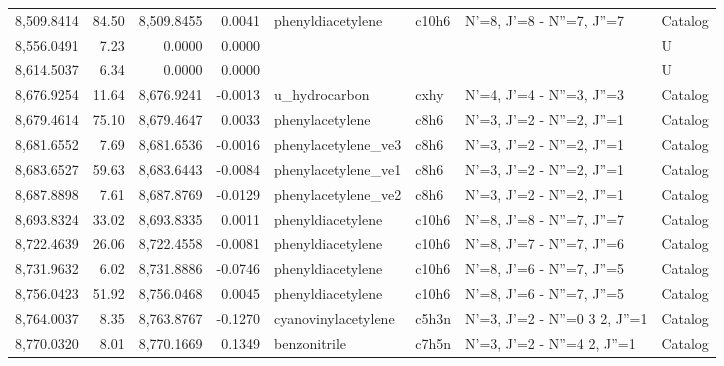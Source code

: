 \begin{longtable}{rrrrllll}
 8,509.8414 &     84.50 &        8,509.8455 &    0.0041 &           phenyldiacetylene &   c10h6 &            N'=8, J'=8 - N''=7, J''=7 &    Catalog \\
 8,556.0491 &      7.23 &            0.0000 &    0.0000 &                             &         &                                      &          U \\
 8,614.5037 &      6.34 &            0.0000 &    0.0000 &                             &         &                                      &          U \\
 8,676.9254 &     11.64 &        8,676.9241 &   -0.0013 &               u_hydrocarbon &    cxhy &            N'=4, J'=4 - N''=3, J''=3 &    Catalog \\
 8,679.4614 &     75.10 &        8,679.4647 &    0.0033 &             phenylacetylene &    c8h6 &            N'=3, J'=2 - N''=2, J''=1 &    Catalog \\
 8,681.6552 &      7.69 &        8,681.6536 &   -0.0016 &         phenylacetylene_ve3 &    c8h6 &            N'=3, J'=2 - N''=2, J''=1 &    Catalog \\
 8,683.6527 &     59.63 &        8,683.6443 &   -0.0084 &         phenylacetylene_ve1 &    c8h6 &            N'=3, J'=2 - N''=2, J''=1 &    Catalog \\
 8,687.8898 &      7.61 &        8,687.8769 &   -0.0129 &         phenylacetylene_ve2 &    c8h6 &            N'=3, J'=2 - N''=2, J''=1 &    Catalog \\
 8,693.8324 &     33.02 &        8,693.8335 &    0.0011 &           phenyldiacetylene &   c10h6 &            N'=8, J'=8 - N''=7, J''=7 &    Catalog \\
 8,722.4639 &     26.06 &        8,722.4558 &   -0.0081 &           phenyldiacetylene &   c10h6 &            N'=8, J'=7 - N''=7, J''=6 &    Catalog \\
 8,731.9632 &      6.02 &        8,731.8886 &   -0.0746 &           phenyldiacetylene &   c10h6 &            N'=8, J'=6 - N''=7, J''=5 &    Catalog \\
 8,756.0423 &     51.92 &        8,756.0468 &    0.0045 &           phenyldiacetylene &   c10h6 &            N'=8, J'=6 - N''=7, J''=5 &    Catalog \\
 8,764.0037 &      8.35 &        8,763.8767 &   -0.1270 &         cyanovinylacetylene &   c5h3n &      N'=3, J'=2 - N''=0 3   2, J''=1 &    Catalog \\
 8,770.0320 &      8.01 &        8,770.1669 &    0.1349 &                benzonitrile &   c7h5n &      N'=3, J'=2 - N''=4     2, J''=1 &    Catalog \\

\end{longtable}
